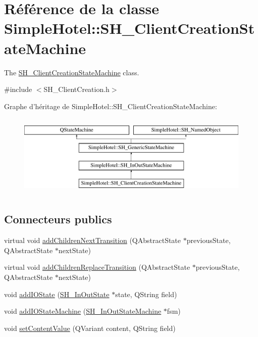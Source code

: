 \hypertarget{classSimpleHotel_1_1SH__ClientCreationStateMachine}{\section{Référence de la classe Simple\-Hotel\-:\-:S\-H\-\_\-\-Client\-Creation\-State\-Machine}
\label{classSimpleHotel_1_1SH__ClientCreationStateMachine}
}


The \hyperlink{classSimpleHotel_1_1SH__ClientCreationStateMachine}{S\-H\-\_\-\-Client\-Creation\-State\-Machine} class.  




{\ttfamily \#include $<$S\-H\-\_\-\-Client\-Creation.\-h$>$}

Graphe d'héritage de Simple\-Hotel\-:\-:S\-H\-\_\-\-Client\-Creation\-State\-Machine\-:\begin{figure}[H]
\begin{center}
\leavevmode
\includegraphics[height=4.000000cm]{classSimpleHotel_1_1SH__ClientCreationStateMachine}
\end{center}
\end{figure}
\subsection*{Connecteurs publics}
\begin{DoxyCompactItemize}
\item 
virtual void \hyperlink{classSimpleHotel_1_1SH__InOutStateMachine_aaf5afe04d6e4d3d5ebf0b5f1b00eddf1}{add\-Children\-Next\-Transition} (Q\-Abstract\-State $\ast$previous\-State, Q\-Abstract\-State $\ast$next\-State)
\item 
virtual void \hyperlink{classSimpleHotel_1_1SH__InOutStateMachine_a3339fd43658e6ac0979bd43014785766}{add\-Children\-Replace\-Transition} (Q\-Abstract\-State $\ast$previous\-State, Q\-Abstract\-State $\ast$next\-State)
\item 
void \hyperlink{classSimpleHotel_1_1SH__InOutStateMachine_a07ae9f1f74a9a41b26e77a014679a33e}{add\-I\-O\-State} (\hyperlink{classSimpleHotel_1_1SH__InOutState}{S\-H\-\_\-\-In\-Out\-State} $\ast$state, Q\-String field)
\item 
void \hyperlink{classSimpleHotel_1_1SH__InOutStateMachine_a27a59a44e0bcddf90d40b38788bb38f4}{add\-I\-O\-State\-Machine} (\hyperlink{classSimpleHotel_1_1SH__InOutStateMachine}{S\-H\-\_\-\-In\-Out\-State\-Machine} $\ast$fsm)
\item 
void \hyperlink{classSimpleHotel_1_1SH__InOutStateMachine_aaf92da452f6cf7cc57aa9e60f88322e4}{set\-Content\-Value} (Q\-Variant content, Q\-String field)
\end{DoxyCompactItemize}
